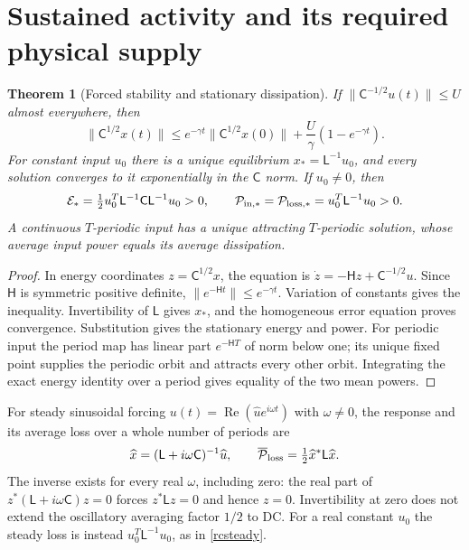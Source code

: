 \documentclass[11pt,letterpaper]{article}
\newtheorem{theorem}{Theorem}[section]
\theoremstyle{definition}
\numberwithin{equation}{section}
\begin{document}
\section{Sustained activity and its required physical supply}
\begin{theorem}[Forced stability and stationary dissipation]\label{rcforced}
If $\|\mathsf C^{-1/2}u(t)\|\leq U$ almost everywhere, then
\begin{equation}\label{rcinputbound}
\|\mathsf C^{1/2}x(t)\|\leq e^{-\gamma t}\|\mathsf C^{1/2}x(0)\|+\frac{U}{\gamma}(1-e^{-\gamma t}).
\end{equation}
For constant input $u_0$ there is a unique equilibrium $x_*=\mathsf L^{-1}u_0$, and every solution converges to it exponentially in the $\mathsf C$ norm. If $u_0\ne0$, then
\begin{equation}\label{rcsteady}
\mathcal E_* =\tfrac12u_0^T\mathsf L^{-1}\mathsf C\mathsf L^{-1}u_0>0,
\qquad \mathcal P_{{\rm in},*}=\mathcal P_{{\rm loss},*}=u_0^T\mathsf L^{-1}u_0>0.
\end{equation}
A continuous $T$-periodic input has a unique attracting $T$-periodic solution, whose average input power equals its average dissipation.
\end{theorem}
\begin{proof}
In energy coordinates $z=\mathsf C^{1/2}x$, the equation is $\dot z=-\mathsf Hz+\mathsf C^{-1/2}u$. Since $\mathsf H$ is symmetric positive definite, $\|e^{-\mathsf Ht}\|\leq e^{-\gamma t}$. Variation of constants gives the inequality. Invertibility of $\mathsf L$ gives $x_*$, and the homogeneous error equation proves convergence. Substitution gives the stationary energy and power. For periodic input the period map has linear part $e^{-\mathsf HT}$ of norm below one; its unique fixed point supplies the periodic orbit and attracts every other orbit. Integrating the exact energy identity over a period gives equality of the two mean powers.
\end{proof}
For steady sinusoidal forcing $u(t)=\operatorname{Re}(\widehat u e^{i\omega t})$ with $\omega\ne0$, the response and its average loss over a whole number of periods are
\begin{equation}\label{rcfrequency}
\widehat x=(\mathsf L+i\omega\mathsf C)^{-1}\widehat u,
\qquad \overline{\mathcal P}_{\rm loss}=\tfrac12\widehat x^*\mathsf L\widehat x.
\end{equation}
The inverse exists for every real $\omega$, including zero: the real part of $z^*(\mathsf L+i\omega\mathsf C)z=0$ forces $z^*\mathsf Lz=0$ and hence $z=0$. Invertibility at zero does not extend the oscillatory averaging factor $1/2$ to DC. For a real constant $u_0$ the steady loss is instead $u_0^T\mathsf L^{-1}u_0$, as in \eqref{rcsteady}.
\end{document}
